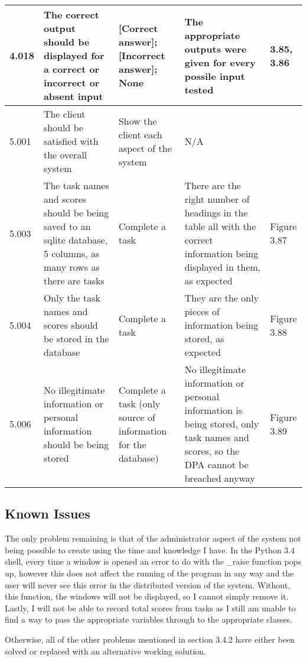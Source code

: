 \begin{landscape}
\begin{center}
\begin{longtable}{|p{2.5cm}|p{4cm}|p{4cm}|p{4.5cm}|p{3cm}|}
4.018 & The correct output should be displayed for a correct or incorrect or absent input & [Correct answer]; [Incorrect answer]; None & The appropriate outputs were given for every possile input tested & 3.85, 3.86 \\ \hline
5.001 & The client should be satisfied with the overall system & Show the client each aspect of the system & N/A & \\ \hline
5.003 & The task names and scores should be being saved to an sqlite database, 5 columns, as many rows as there are tasks & Complete a task & There are the right number of headings in the table all with the correct information being displayed in them, as expected & Figure 3.87 \\ \hline
5.004 & Only the task names and scores should be stored in the database & Complete a task & They are the only pieces of information being stored, as expected & Figure 3.88 \\ \hline
5.006 & No illegitimate information or personal information should be being stored & Complete a task (only source of information for the database) & No illegitimate information or personal information is being stored, only task names and scores, so the DPA cannot be breached anyway & Figure 3.89 \\ \hline
\end{longtable}
\end{center}

\end{landscape}

\subsection{Known Issues}

The only problem remaining is that of the administrator aspect of the system not being possible to create using the time and knowledge I have. In the Python 3.4 shell, every time a window is opened an error to do with the \_raise function pops up, however this does not affect the running of the program in any way and the user will never see this error in the distributed version of the system. Without, this function, the windows will not be displayed, so I cannot simply remove it. Lastly, I will not be able to record total scores from tasks as I still am unable to find a way to pass the appropriate variables through to the appropriate classes.

Otherwise, all of the other problems mentioned in section 3.4.2 have either been solved or replaced with an alternative working solution.

